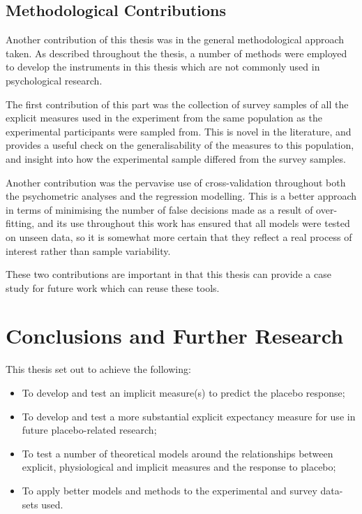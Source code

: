 \subsection{Methodological Contributions}
\label{sec:meth-contr}

Another contribution of this thesis was in the general methodological approach taken. 
As described throughout the thesis, a number of methods were employed to develop the instruments 
in this thesis which are not commonly used in psychological research.

The first contribution of this part was the collection of survey samples of all the explicit
measures used in the experiment from the same population as the experimental participants were sampled from. This is novel in the literature, and provides a useful check on the generalisability of the measures to this population, and insight into how the experimental sample differed from the survey samples. 

Another contribution was the pervavise use of cross-validation throughout both the psychometric analyses and the regression modelling. This is a better approach in terms of minimising the number of false decisions made as a result of over-fitting, and its use throughout this work has ensured that all models were tested on unseen data, so it is somewhat more certain that they reflect a real process of interest rather than sample variability. 

These two contributions are important in that this thesis can provide a case study for future work which can reuse these tools. 
\section{Conclusions and Further Research}
\label{sec:concl-furth-rese}


This thesis set out to achieve the following:

\begin{itemize}
\item To develop and test an implicit measure(s) to predict the
placebo response;
\item To develop and test a more substantial explicit expectancy
measure for use in future placebo-related research;
\item To test a number of theoretical models around the relationships
between explicit, physiological and implicit measures and the response
to placebo;
\item To apply better models and methods to the experimental and survey data-sets used.
\end{itemize}

